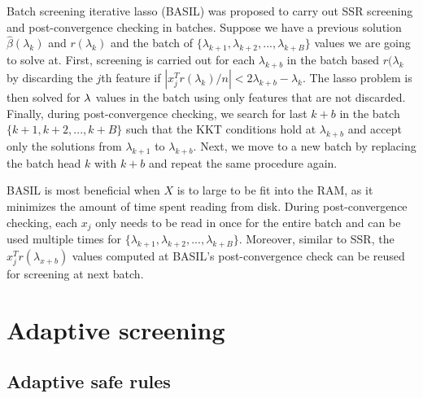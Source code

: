 Batch screening iterative lasso (BASIL) \citep{qian2019fast} was proposed to carry out SSR screening and post-convergence checking in batches. Suppose we have a previous solution $\hat{\beta}(\lambda_k)$ and $r(\lambda_k)$ and the batch of $\{\lambda_{k+1},\lambda_{k+2},...,\lambda_{k+B}\}$ values we are going to solve at. First, screening is carried out for each $\lambda_{k+b}$ in the batch based $r(\lambda_k$ by discarding the $j$th feature if $|x_j^Tr(\lambda_k)/n|<2\lambda_{k+b}-\lambda_k$. The lasso problem is then solved for $\lambda$ values in the batch using only features that are not discarded. Finally, during post-convergence checking, we search for last $k+b$ in the batch $\{k+1,k+2,...,k+B\}$ such that the KKT conditions hold at $\lambda_{k+b}$ and accept only the solutions from $\lambda_{k+1}$ to $\lambda_{k+b}$. Next, we move to a new batch by replacing the batch head $k$ with $k+b$ and repeat the same procedure again.

BASIL is most beneficial when $X$ is to large to be fit into the RAM, as it minimizes the amount of time spent reading from disk. During post-convergence checking, each $x_j$ only needs to be read in once for the entire batch and can be used multiple times for $\{\lambda_{k+1},\lambda_{k+2},...,\lambda_{k+B}\}$. Moreover, similar to SSR, the $x_j^Tr(\lambda_{x+b})$ values computed at BASIL's post-convergence check can be reused for screening at next batch.


\section{Adaptive screening}
\label{sec:method}


\subsection{Adaptive safe rules}


